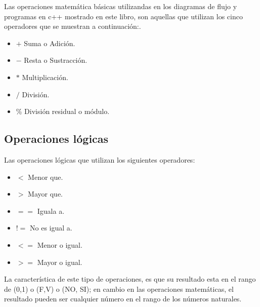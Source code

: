 \documentclass[a4paper,12pt,spanish]{article}
\begin{document}
Las operaciones matemática básicas utilizandas en los diagramas de flujo y programas en c++ mostrado en este libro, son aquellas que utilizan los cinco operadores que se muestran a continuación:.\\

\begin{minipage}[H]{0.45\linewidth}
\begin{itemize}
  \item $+$   Suma o Adición.
  \item $-$   Resta o Sustracción.
  \item $*$  Multiplicación.
\end{itemize}
\end{minipage}
\begin{minipage}[H]{0.50\linewidth}
\begin{itemize}
  \item $/$  División.
  \item \% División residual  o módulo.
\end{itemize}
\end{minipage}
\subsection{Operaciones lógicas}
\label{sec:operaciones-logicas}

Las operaciones lógicas que utilizan los siguientes operadores:

\begin{minipage}[H]{0.45\linewidth}
  \begin{itemize}
    \item $<$ Menor que.
    \item $>$ Mayor que.
    \item $==$ Iguala a.
  \end{itemize}
\end{minipage}
\begin{minipage}{0.45\linewidth}
  \begin{itemize}
    \item $!=$  No es igual a.
  \item $<=$ Menor o igual.
    \item $>=$ Mayor o igual.
  \end{itemize}
\end{minipage}

La característica de este tipo de operaciones, es que su resultado esta en el rango de (0,1) o (F,V) o (NO, SI); en cambio en las operaciones matemáticas, el resultado pueden ser cualquier número en el rango de los números naturales.\\
\end{document}
